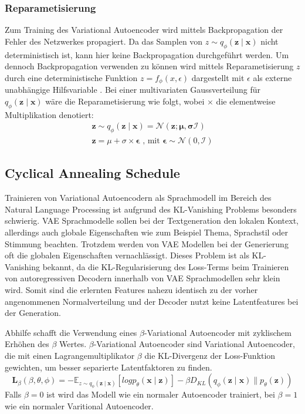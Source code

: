 \subsubsection{Reparametisierung} %
Zum Training des Variational Autoencoder wird mittels Backpropagation der Fehler des Netzwerkes propagiert. Da das Samplen von $z \sim q_\phi(\mathbf{z\mid x})$ nicht deterministisch ist, kann hier keine Backpropagation durchgeführt werden.
Um dennoch Backpropagation verwenden zu können wird mittels Reparametisierung $z$ durch eine deterministische Funktion $z=f_\phi(x,\epsilon)$ dargestellt mit $\epsilon$ als externe unabhängige Hilfsvariable \citep{kingma2014autoencoding,jordan_2018}. 
Bei einer multivariaten Gaussverteilung für $q_\phi (\mathbf{z\mid x})$ wäre die Reparametisierung wie folgt, wobei $\times$ die elementweise Multiplikation denotiert:
\begin{align}
    \mathbf{z} \sim q_\phi(\mathbf{z\mid x}) = \mathcal{N}(\mathbf{z;\mu,\sigma \mathcal{I}}) \\
    \mathbf{z} = \mu + \sigma \times \mathbf{\epsilon} \text{ , mit } \mathbf{\epsilon} \sim \mathcal{N}(0,\mathcal{I}) 
\end{align}

\subsection{Cyclical Annealing Schedule}
\label{cyc_anneal}
Trainieren von Variational Autoencodern als Sprachmodell im Bereich des Natural Language Processing ist aufgrund des KL-Vanishing Problems besonders schwierig.
VAE Sprachmodelle sollen bei der Textgeneration den lokalen Kontext, allerdings auch globale Eigenschaften wie zum Beispiel Thema, Sprachstil oder Stimmung beachten. 
Trotzdem werden von VAE Modellen bei der Generierung oft die globalen Eigenschaften vernachlässigt. 
Dieses Problem ist als KL-Vanishing bekannt, da die KL-Regularisierung des Loss-Terms beim Trainieren von autoregressiven Decodern innerhalb von VAE Sprachmodellen sehr klein wird.
Somit sind die erlernten Features nahezu identisch zu der vorher angenommenen Normalverteilung und der Decoder nutzt keine Latentfeatures bei der Generation. %

Abhilfe schafft die Verwendung eines $\beta$-Variational Autoencoder \citep{cyc_anneal} mit zyklischem Erhöhen des $\beta$ Wertes.
$\beta$-Variational Autoencoder sind Variational Autoencoder, die mit einen Lagrangemultiplikator $\beta$ die KL-Divergenz der Loss-Funktion gewichten, um besser separierte Latentfaktoren zu finden.
\begin{equation}
    \mathbf{L}_{\beta} (\beta,\theta,\phi)= -\mathbb{E}_{z\sim q_\phi(\mathbf{z\mid x})}[log p_\theta (\mathbf{x\mid z})]- \beta D_{KL}(q_\phi(\mathbf{z\mid x}) \parallel p_\theta(\mathbf{z})) 
\end{equation}
Falls $\beta = 0$ ist wird das Modell wie ein normaler Autoencoder trainiert, bei $\beta = 1$ wie ein normaler Varitional Autoencoder.

